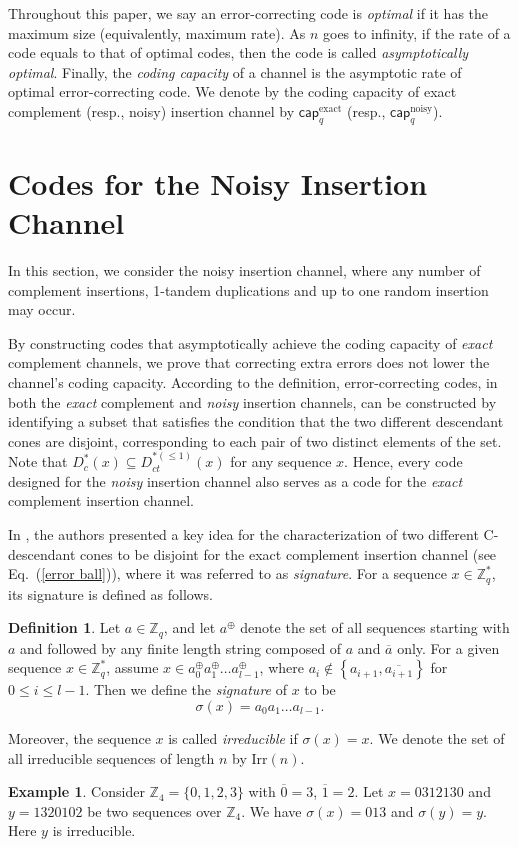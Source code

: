 \documentclass[pdflatex,sn-mathphys-num]{sn-jnl}
\theoremstyle{theorem}%
\theoremstyle{definition}
\newtheorem{definition}{Definition}
\newtheorem{example}{Example}
\theoremstyle{construction}
\newtheorem{open problem}{Open problem}
\begin{document}
Throughout this paper, we say an error-correcting code is \emph{optimal} if it has the maximum size (equivalently, maximum rate). As $n$ goes to infinity, if the rate of a code equals to that of optimal codes, then the code is called \emph{asymptotically optimal}. 
Finally, the \emph{coding capacity} of a channel is the asymptotic rate of optimal error-correcting code. We denote by the coding capacity of exact  complement (resp., noisy) insertion channel by $\mathsf{cap}^{\text{exact}}_{q}$ (resp., $\mathsf{cap}^{\text{noisy}}_{q}$).
\section{Codes for the Noisy Insertion Channel}\label{sec:3}
In this section, we consider the noisy insertion channel, where any number of complement insertions, 1-tandem duplications and up to one random insertion may occur.\par 

By constructing codes that asymptotically achieve the coding capacity of \emph{exact} complement channels, we prove that correcting extra errors does not lower the channel's coding capacity. According to the definition, error-correcting codes, in both the \textit{exact} complement and \textit{noisy} insertion channels, can be constructed by identifying a subset that satisfies the condition that the two different descendant cones are disjoint, corresponding to each pair of two distinct elements of the set. Note that $D_{c}^{*}(x) \subseteq D_{ct}^{*(\leq 1)}(x)$ for any sequence $x$. Hence, every code designed for the \textit{noisy} insertion channel also serves as a code for the \textit{exact} complement insertion channel. \par 

In \cite{ys2}, the authors presented a key idea for the characterization of two different C-descendant cones to be disjoint for the exact complement insertion channel (see Eq.~(\ref{error ball})), where it was referred to as \emph{signature}. For a sequence $x\in \mathbb{Z}_{q}^{*}$, its signature is defined as follows.
 \begin{definition}
 Let $a\in \mathbb{Z}_{q}$, and let $a^{\oplus}$ denote the set of all sequences starting with $a$ and followed by any finite
 length string composed of $a$ and $\overline{a}$ only. For a given sequence $x\in \mathbb{Z}_{q}^{*}$, assume $x\in a_{0}^{\oplus}a_{1}^{\oplus}\ldots a_{l-1}^{\oplus}$, where $a_{i}\notin \left \{ a_{i+1},\overline{a_{i+1}} \right \} $ for $0\leq i \leq l-1$. Then we define the \emph{signature} of $x$ to be $$\sigma (x) = a_{0}a_{1}\ldots a_{l-1}.$$ 
 
 Moreover, the sequence $x$ is called \emph{irreducible} if $\sigma (x)=x$. We denote the set of all irreducible sequences of length $n$ by  $\mathrm{Irr}(n)$.
 \end{definition}
 \begin{example}
  Consider $\mathbb{Z}_4=\{0, 1, 2, 3\}$ with $\overline{0}=3$, $\overline{1}=2$. Let $x=0312130$ and  $y=1320102$ be two sequences over $\mathbb{Z}_4$. We have $\sigma (x)=013$ and $\sigma (y)=y$.  Here $y$ is irreducible.
 \end{example}
 
\end{document}
